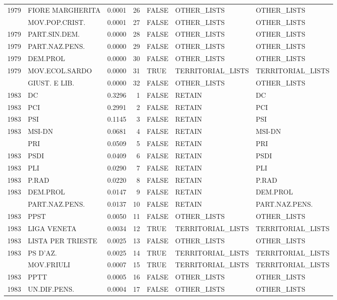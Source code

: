 \begin{longtable}[t]{rlrrlll}
1979 & FIORE MARGHERITA & 0.0001 & 26 & FALSE & OTHER\_LISTS & OTHER\_LISTS\\
\addlinespace
1979 & MOV.POP.CRIST. & 0.0001 & 27 & FALSE & OTHER\_LISTS & OTHER\_LISTS\\
1979 & PART.SIN.DEM. & 0.0000 & 28 & FALSE & OTHER\_LISTS & OTHER\_LISTS\\
1979 & PART.NAZ.PENS. & 0.0000 & 29 & FALSE & OTHER\_LISTS & OTHER\_LISTS\\
1979 & DEM.PROL & 0.0000 & 30 & FALSE & OTHER\_LISTS & OTHER\_LISTS\\
1979 & MOV.ECOL.SARDO & 0.0000 & 31 & TRUE & TERRITORIAL\_LISTS & TERRITORIAL\_LISTS\\
\addlinespace
1979 & GIUST. E LIB. & 0.0000 & 32 & FALSE & OTHER\_LISTS & OTHER\_LISTS\\
1983 & DC & 0.3296 & 1 & FALSE & RETAIN & DC\\
1983 & PCI & 0.2991 & 2 & FALSE & RETAIN & PCI\\
1983 & PSI & 0.1145 & 3 & FALSE & RETAIN & PSI\\
1983 & MSI-DN & 0.0681 & 4 & FALSE & RETAIN & MSI-DN\\
\addlinespace
1983 & PRI & 0.0509 & 5 & FALSE & RETAIN & PRI\\
1983 & PSDI & 0.0409 & 6 & FALSE & RETAIN & PSDI\\
1983 & PLI & 0.0290 & 7 & FALSE & RETAIN & PLI\\
1983 & P.RAD & 0.0220 & 8 & FALSE & RETAIN & P.RAD\\
1983 & DEM.PROL & 0.0147 & 9 & FALSE & RETAIN & DEM.PROL\\
\addlinespace
1983 & PART.NAZ.PENS. & 0.0137 & 10 & FALSE & RETAIN & PART.NAZ.PENS.\\
1983 & PPST & 0.0050 & 11 & FALSE & OTHER\_LISTS & OTHER\_LISTS\\
1983 & LIGA VENETA & 0.0034 & 12 & TRUE & TERRITORIAL\_LISTS & TERRITORIAL\_LISTS\\
1983 & LISTA PER TRIESTE & 0.0025 & 13 & FALSE & OTHER\_LISTS & OTHER\_LISTS\\
1983 & PS D'AZ. & 0.0025 & 14 & TRUE & TERRITORIAL\_LISTS & TERRITORIAL\_LISTS\\
\addlinespace
1983 & MOV.FRIULI & 0.0007 & 15 & TRUE & TERRITORIAL\_LISTS & TERRITORIAL\_LISTS\\
1983 & PPTT & 0.0005 & 16 & FALSE & OTHER\_LISTS & OTHER\_LISTS\\
1983 & UN.DIF.PENS. & 0.0004 & 17 & FALSE & OTHER\_LISTS & OTHER\_LISTS\\

\end{longtable}
